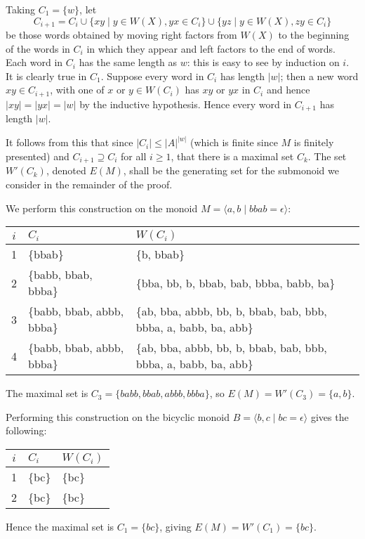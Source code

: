 \documentclass[libertine,widepage,nosubthm]{lmaths}
\begin{document}
Taking $C_1 = \{w\}$, let
	\[ C_{i+1} = C_i \cup \{ xy \mid y \in W(X), yx \in C_i \} \cup \{ yz \mid y \in W(X), zy \in C_i \} \]
be those words obtained by moving right factors from $W(X)$ to the beginning of the words in $C_i$ in which they appear and left factors to the end of words. Each word in $C_i$ has the same length as $w$: this is easy to see by induction on $i$. It is clearly true in $C_1$. Suppose every word in $C_i$ has length $|w|$; then a new word $xy \in C_{i+1}$, with one of $x$ or $y \in W(C_i)$ has $xy$ or $yx$ in $C_i$ and hence $|xy| = |yx| = |w|$ by the inductive hypothesis. Hence every word in $C_{i+1}$ has length $|w|$.

It follows from this that since $|C_i| \le |A|^{|w|}$ (which is finite since $M$ is finitely presented) and $C_{i+1} \supseteq C_i$ for all $i \ge 1$, that there is a maximal set $C_k$. The set $W'(C_k)$, denoted $E(M)$, shall be the generating set for the submonoid we consider in the remainder of the proof.

\begin{example}
	We perform this construction on the monoid $M = \langle a, b \mid bbab = \epsilon \rangle$:

	\begin{center}
	\begin{tabular}{c|ll}
		$i$ & $C_i$ & $W(C_i)$ \\
		\hline
		1 & \{bbab\} & \{b, bbab\} \\
		2 & \{babb, bbab, bbba\} & \{bba, bb, b, bbab, bab, bbba, babb, ba\} \\
		3 & \{babb, bbab, abbb, bbba\} & \{ab, bba, abbb, bb, b, bbab, bab, bbb, bbba, a, babb, ba, abb\} \\
		4 & \{babb, bbab, abbb, bbba\} & \{ab, bba, abbb, bb, b, bbab, bab, bbb, bbba, a, babb, ba, abb\}
	\end{tabular}
	\end{center}

	The maximal set is $C_3 = \{babb, bbab, abbb, bbba\}$, so $E(M) = W'(C_3) = \{a, b\}$.
\end{example}

\begin{example}
	Performing this construction on the bicyclic monoid $B = \langle b, c \mid bc = \epsilon \rangle$ gives the following:

	\begin{center}
	\begin{tabular}{c|ll}
		$i$ & $C_i$ & $W(C_i)$ \\
		\hline
		1 & \{bc\} & \{bc\} \\
		2 & \{bc\} & \{bc\}
	\end{tabular}
	\end{center}

	Hence the maximal set is $C_1 = \{bc\}$, giving $E(M) = W'(C_1) = \{ bc \}$.
\end{example}
\end{document}
